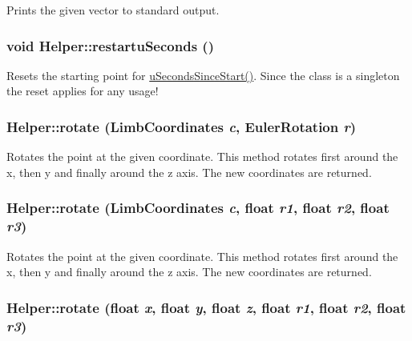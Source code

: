 \label{classHelper_ad062c1e9734c97ad2b6ed84ad9bb6bf5}
Prints the given vector to standard output. \hypertarget{classHelper_a0c44aeaa13ff3abb4ff9a33362c0c6c1}{
\subsubsection[{restartuSeconds}]{\setlength{\rightskip}{0pt plus 5cm}void Helper::restartuSeconds ()}}
\label{classHelper_a0c44aeaa13ff3abb4ff9a33362c0c6c1}
Resets the starting point for \hyperlink{classHelper_a58eb1df824ee417e918d7066120886f7}{uSecondsSinceStart()}. Since the class is a singleton the reset applies for any usage! \hypertarget{classHelper_a5a2e9dd4a8aee4800d0da513290c4ccc}{
\subsubsection[{rotate}]{ Helper::rotate ({\bf LimbCoordinates} {\em c}, \/  {\bf EulerRotation} {\em r})}}
\label{classHelper_a5a2e9dd4a8aee4800d0da513290c4ccc}
Rotates the point at the given coordinate. This method rotates first around the x, then y and finally around the z axis. The new coordinates are returned. \hypertarget{classHelper_a9baf1a3c1e905f4c0a6eab636dfb49cc}{
\subsubsection[{rotate}]{ Helper::rotate ({\bf LimbCoordinates} {\em c}, \/  float {\em r1}, \/  float {\em r2}, \/  float {\em r3})}}
\label{classHelper_a9baf1a3c1e905f4c0a6eab636dfb49cc}
Rotates the point at the given coordinate. This method rotates first around the x, then y and finally around the z axis. The new coordinates are returned. \hypertarget{classHelper_a2255b24c7cf22a501f2edff436294349}{
\subsubsection[{rotate}]{ Helper::rotate (float {\em x}, \/  float {\em y}, \/  float {\em z}, \/  float {\em r1}, \/  float {\em r2}, \/  float {\em r3})}}
